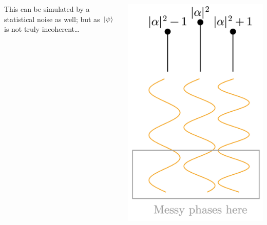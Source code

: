 \documentclass[t]{beamer}
\begin{document}
\begin{frame}
\begin{columns}[T]
\begin{column}{0.7\textwidth}
        This can be simulated by a statistical noise as well; but as $\ket*{\psi}$ is not truly incoherent\dots 
    \end{column}
    \begin{column}{0.3\textwidth}
        \vspace{0.2cm}
        \includegraphics[width=\textwidth]{figs/coherent-different-phases.png}
    \end{column}
\end{columns}

\end{frame}
\end{document}
